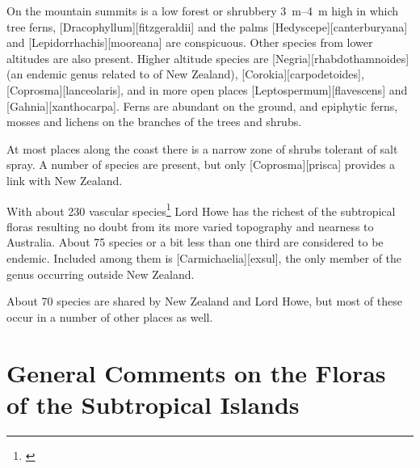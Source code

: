 On the mountain summits is a low forest or shrubbery \SIrange{3}{4}{\metre} high in which tree ferns, [Dracophyllum][fitzgeraldii] and the palms [Hedyscepe][canterburyana] and [Lepidorrhachis][mooreana] are conspicuous.
Other species from lower altitudes are also present.
Higher altitude species are [Negria][rhabdothamnoides] (an endemic genus related to  of New Zealand), [Corokia][carpodetoides], [Coprosma][lanceolaris], and in more open places [Leptospermum][flavescens] and [Gahnia][xanthocarpa].
Ferns are abundant on the ground, and epiphytic ferns, mosses and lichens on the branches of the trees and shrubs.

At most places along the coast there is a narrow zone of shrubs tolerant of salt spray.
A number of species are present, but only [Coprosma][prisca] provides a link with New Zealand.

With about 230 vascular species\footnote{\cite{rodd1983census}} Lord Howe has the richest of the subtropical floras resulting no doubt from its more varied topography and nearness to Australia.
About 75 species or a bit less than one third are considered to be endemic.
Included among them is [Carmichaelia][exsul], the only member of the genus occurring outside New Zealand.

About 70 species are shared by New Zealand and Lord Howe, but most of these occur in a number of other places as well.

\section{General Comments on the Floras of the Subtropical Islands}

